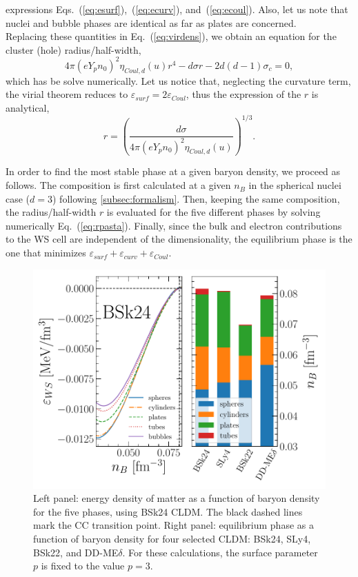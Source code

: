 expressions Eqs.~(\ref{eq:esurf}),~(\ref{eq:ecurv}), and~(\ref{eq:ecoul}). Also, let us
note that nuclei and bubble phases are identical as far as plates are concerned.\\
Replacing these quantities in Eq.~(\ref{eq:virdens}), we obtain an equation for
the cluster (hole) radius/half-width,
%
\begin{equation}
  4\pi(eY_pn_0)^2\eta_{Coul,d}(u){r}^4 - d\sigma r - 2d(d-1)\sigma_c 
  = 0,\label{eq:rpasta}
\end{equation}
%
which has be solve numerically. Let us notice that, neglecting the 
curvature term, the virial theorem reduces 
to $\varepsilon_{surf} = 2\varepsilon_{Coul}$, thus the expression of the 
$r$ is analytical,
%
\begin{equation}
  r =
  \left(\frac{d\sigma}{4\pi(eY_pn_0)^2\eta_{Coul,d}(u)}\right)^{1/3}.
\end{equation}

In order to find the most stable phase at a given baryon density, we proceed as
follows. 
The composition is first calculated at a given $n_B$ in the spherical nuclei 
case ($d=3$) following \ref{subsec:formalism}. Then, keeping the same 
composition, the radius/half-width $r$ is evaluated for the five different 
phases by solving numerically Eq.~(\ref{eq:rpasta}). Finally, since the bulk
and electron contributions to the WS cell are independent of the 
dimensionality, the equilibrium phase is the one that minimizes 
$\varepsilon_{surf} + \varepsilon_{curv} 
+ \varepsilon_{Coul}$.

\begin{figure}[!t]
\begin{center}
  \includegraphics[width=0.9\linewidth]{figures/pasta.pdf}
\end{center}
\caption[Pasta phases in the inner crust]{Left panel: energy density of matter 
  as a function of baryon density for the five phases, using BSk24 
CLDM. The black dashed lines mark the CC transition point. Right panel: 
equilibrium phase as a function of baryon density for four
selected CLDM: BSk24, SLy4, BSk22, and DD-ME$\delta$. For these calculations,
the surface parameter $p$ is fixed to the value $p=3$.}\label{fig:pasta}
\end{figure}

